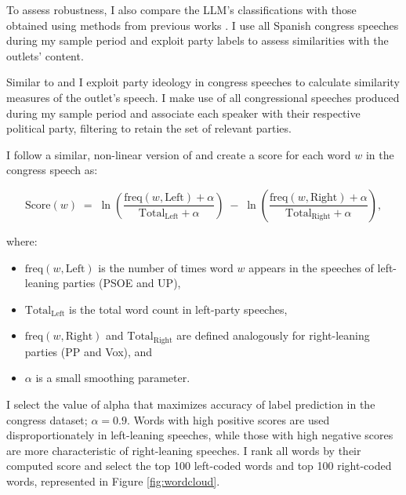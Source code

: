 \documentclass[12pt]{article}
\begin{document}
To assess robustness, I also compare the LLM’s classifications with those obtained using methods from previous works \citep{gentzkow2010media,laver2003extracting}. I use all Spanish congress speeches during my sample period and exploit party labels to assess similarities with the outlets’ content. 


Similar to \cite{gentzkow2010media} and \cite{laver2003extracting} I exploit party ideology in congress speeches to calculate similarity measures of the outlet's speech. I make use of all congressional speeches produced during my sample period and associate each speaker with their respective political party, filtering to retain the set of relevant parties.

I follow a similar, non-linear version of \cite{laver2003extracting} and create a score for each word $w$ in the congress speech as: 



\begin{equation}
	\text{Score}(w) \;=\; \ln \left( \frac{\mathrm{freq}(w,\text{Left}) + \alpha}{\mathrm{Total}_{\text{Left}} + \alpha} \right) \;-\; \ln \left( \frac{\mathrm{freq}(w,\text{Right}) + \alpha}{\mathrm{Total}_{\text{Right}} + \alpha} \right),
	\label{eq:log_ratio}
\end{equation}

where:
\begin{itemize}
	\item $\mathrm{freq}(w,\text{Left})$ is the number of times word $w$ appears in the speeches of left-leaning parties (PSOE and UP),
	\item $\mathrm{Total}_{\text{Left}}$ is the total word count in left-party speeches,
	\item $\mathrm{freq}(w,\text{Right})$ and $\mathrm{Total}_{\text{Right}}$ are defined analogously for right-leaning parties (PP and Vox), and
	\item $\alpha$ is a small smoothing parameter.
	
\end{itemize}

I select the value of alpha that maximizes accuracy of label prediction in the congress dataset; $\alpha=0.9$.	
Words with high positive scores are used disproportionately in left-leaning speeches, while those with high negative scores are more characteristic of right-leaning speeches. I rank all words by their computed score and select the top 100 left-coded words and top 100 right-coded words, represented in  Figure  \ref{fig:wordcloud}. 
\end{document}
